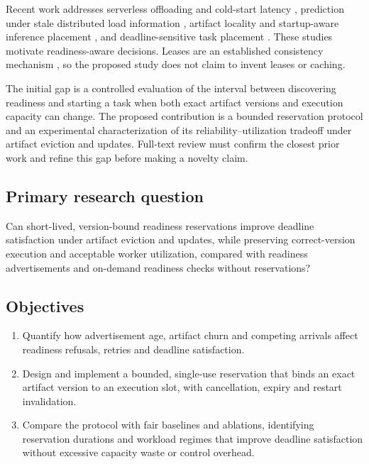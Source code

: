 \documentclass[11pt,a4paper]{article}
\begin{document}
Recent work addresses serverless offloading and cold-start latency \cite{li2025aiho}, prediction under stale distributed load information \cite{hamid2026staleness}, artifact locality and startup-aware inference placement \cite{fu2024serverlessllm}, and deadline-sensitive task placement \cite{abdi2024offloading}. These studies motivate readiness-aware decisions. Leases are an established consistency mechanism \cite{gray1989leases}, so the proposed study does not claim to invent leases or caching.

The initial gap is a controlled evaluation of the interval between discovering readiness and starting a task when both exact artifact versions and execution capacity can change. The proposed contribution is a bounded reservation protocol and an experimental characterization of its reliability--utilization tradeoff under artifact eviction and updates. Full-text review must confirm the closest prior work and refine this gap before making a novelty claim.

\subsection{Primary research question}

Can short-lived, version-bound readiness reservations improve deadline satisfaction under artifact eviction and updates, while preserving correct-version execution and acceptable worker utilization, compared with readiness advertisements and on-demand readiness checks without reservations?

\subsection{Objectives}

\begin{enumerate}
\item Quantify how advertisement age, artifact churn and competing arrivals affect readiness refusals, retries and deadline satisfaction.
\item Design and implement a bounded, single-use reservation that binds an exact artifact version to an execution slot, with cancellation, expiry and restart invalidation.
\item Compare the protocol with fair baselines and ablations, identifying reservation durations and workload regimes that improve deadline satisfaction without excessive capacity waste or control overhead.
\end{enumerate}
\end{document}
